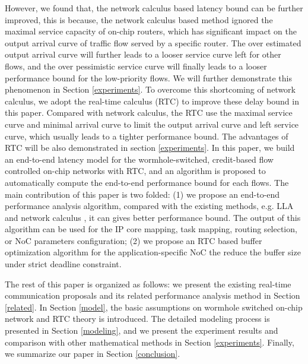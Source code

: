 \documentclass[10pt,journal]{IEEEtran}
\begin{document}
However, we found that, the network calculus based latency bound can be further improved, this is because, the network calculus based method \cite{Qian489900} ignored the maximal service capacity of on-chip routers, which has significant impact on the output arrival curve of traffic flow served by a specific router. The over estimated output arrival curve will further leads to a looser service curve left for other flows, and the over pessimistic service curve will finally leads to a looser performance bound for the low-priority flows. We will further demonstrate this phenomenon in Section \ref{experiments}. To overcome this shortcoming of network calculus, we adopt the real-time calculus (RTC) to improve these delay bound in this paper. Compared with network calculus, the RTC use the maximal service curve and minimal arrival curve to limit the output arrival curve and left service curve, which usually leads to a tighter performance bound. The advantages of RTC will be also demonstrated in section \ref{experiments}. In this paper, we build an end-to-end latency model for the wormhole-switched, credit-based flow controlled on-chip networks with RTC, and an algorithm is proposed to automatically compute the end-to-end performance bound for each flows. The main contribution of this paper is two folded: (1) we propose an end-to-end performance analysis algorithm, compared with the existing methods, e.g. LLA \cite{73}\cite{189} and network calculus \cite{Qian489900}, it can gives better performance bound. The output of this algorithm can be used for the IP core mapping, task mapping, routing selection, or NoC parameters configuration; (2) we propose an RTC based buffer optimization algorithm for the application-specific NoC the reduce the buffer size under strict deadline constraint.

The rest of this paper is organized as follows: we present the existing real-time communication proposals and its related performance analysis method in Section \ref{related}. In Section \ref{model}, the basic assumptions on wormhole switched on-chip network and RTC theory is introduced. The detailed modeling process is presented in Section \ref{modeling}, and we present the experiment results and comparison with other mathematical methods in Section \ref{experiments}. Finally, we summarize our paper in Section \ref{conclusion}.
\end{document}
